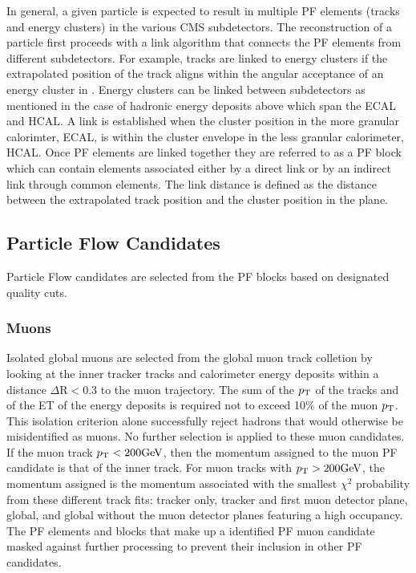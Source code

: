 In general, a given particle is expected to result in multiple PF elements (tracks and energy
clusters) in the various CMS subdetectors. The reconstruction of a particle first proceeds 
with a link algorithm that connects the PF elements from different subdetectors. For example,
tracks are linked to energy clusters if the extrapolated position of the track aligns within the
angular acceptance of an energy cluster in \etaphi. Energy clusters can be linked between subdetectors as mentioned
in the case of hadronic energy deposits above which span the ECAL and HCAL. A link is established
when the cluster position in the more granular calorimter, ECAL, is within the cluster envelope
in the less granular calorimeter, HCAL. Once PF elements are linked together they are referred to as a PF block which can contain 
elements associated either by a direct link or by an indirect link through common elements.
The link distance is defined as the distance between the extrapolated track position and the 
cluster position in the \etaphi plane.


\subsection{Particle Flow Candidates}
Particle Flow candidates are selected from the PF blocks based on designated quality cuts.


\subsubsection{Muons}
Isolated global muons are selected from the global muon track colletion by looking at the inner
tracker tracks and calorimeter 
energy deposits within a distance $\Delta \text{R} < 0.3$ to the muon trajectory. 
The sum of the $p_\mathrm{T}$ of the tracks and of the ET of the energy deposits is required not to 
exceed 10\% of the muon $p_\mathrm{T}$. This isolation criterion alone successfully reject hadrons that would
otherwise be misidentified as muons. No further selection is applied to these muon candidates.
If the muon track $p_\mathrm{T} < 200\mathrm{GeV}$, then the momentum assigned to the muon PF candidate is that of 
the inner track. For muon tracks with $p_\mathrm{T} > 200\mathrm{GeV}$, the momentum assigned is the momentum associated
with the smallest $\chi^2$ probability from these different track fits: tracker only, tracker and 
first muon detector plane, global, and global without the muon detector planes featuring a high occupancy.
The PF elements and blocks that make up a identified PF muon candidate masked against further processing
to prevent their inclusion in other PF candidates.

